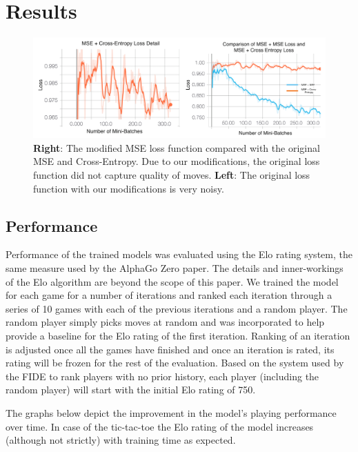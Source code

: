 \documentclass[english]{article}
\begin{document}
\section{Results}

\begin{figure}
\centering
\includegraphics[width=\textwidth]{plots}
    \caption{\textbf{Right}: The modified MSE loss function compared with the original MSE and
    Cross-Entropy. Due to our modifications, the original loss function did not
    capture quality of moves. \textbf{Left}: The original loss function with our modifications is very noisy.}
    \label{fig:lossMSE}
\end{figure}


\subsection{Performance}

Performance of the trained models was evaluated using the Elo\cite{Elo} rating
system, the same measure used by the AlphaGo Zero paper. The details and
inner-workings of the Elo algorithm are beyond the scope of this paper. We
trained the model for each game for a number of iterations and ranked each
iteration through a series of 10 games with each of the previous iterations and a random
player. The random player simply picks moves at random and was incorporated to help
provide a baseline for the Elo rating of the first iteration. Ranking of an
iteration is adjusted once all the games have finished and once an iteration is
rated, its rating will be frozen for the rest of the evaluation. Based on the
system used by the FIDE \cite{Elo} to rank players with no prior history, each player (including the random player) will start with the initial Elo rating of 750. 

The graphs below depict the improvement in the model's playing performance over time. In case of the tic-tac-toe the Elo rating of the model increases (although not strictly) with training time as expected.
\end{document}
